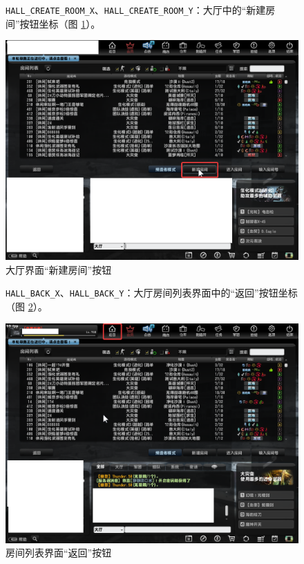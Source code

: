 \begin{figure}[H]
    \Centering
    \parbox[l]{\textwidth}{\lstinline{HALL_CREATE_ROOM_X}、\lstinline{HALL_CREATE_ROOM_Y}：大厅中的“新建房间”按钮坐标（图 \ref{ch2fig-create-room-0}）。}
    \includegraphics[width=\textwidth]{docs/assets/create_room_0}
    \caption{大厅界面“新建房间”按钮}
    \label{ch2fig-create-room-0}
\end{figure}
\clearpage

\begin{figure}[H]
    \Centering
    \parbox[l]{\textwidth}{\lstinline{HALL_BACK_X}、\lstinline{HALL_BACK_Y}：大厅房间列表界面中的“返回”按钮坐标（图 \ref{ch2fig-hall-back}）。}
    \includegraphics[width=\textwidth]{docs/assets/hall_back}
    \caption{房间列表界面“返回”按钮}
    \label{ch2fig-hall-back}
\end{figure}
\clearpage

